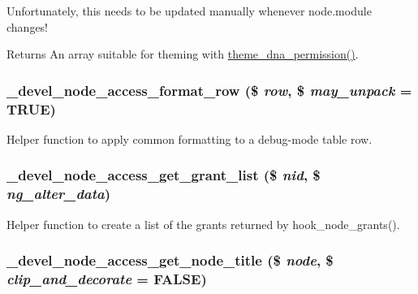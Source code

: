 Unfortunately, this needs to be updated manually whenever node.module changes!

\begin{DoxyReturn}{Returns}
An array suitable for theming with \hyperlink{devel__node__access_8module_a9a1d86356d3e21f44fd2bc73a915b329}{theme\_\-dna\_\-permission()}. 
\end{DoxyReturn}
\hypertarget{devel__node__access_8module_acd34231a07364b267c722f6335eb4a3f}{
\subsubsection[{\_\-devel\_\-node\_\-access\_\-format\_\-row}]{\setlength{\rightskip}{0pt plus 5cm}\_\-devel\_\-node\_\-access\_\-format\_\-row (\$ {\em row}, \/  \$ {\em may\_\-unpack} = {\ttfamily TRUE})}}
\label{devel__node__access_8module_acd34231a07364b267c722f6335eb4a3f}
Helper function to apply common formatting to a debug-\/mode table row. \hypertarget{devel__node__access_8module_a58e0c4afd1e983169bad627bcdfc9b89}{
\subsubsection[{\_\-devel\_\-node\_\-access\_\-get\_\-grant\_\-list}]{\setlength{\rightskip}{0pt plus 5cm}\_\-devel\_\-node\_\-access\_\-get\_\-grant\_\-list (\$ {\em nid}, \/  \$ {\em ng\_\-alter\_\-data})}}
\label{devel__node__access_8module_a58e0c4afd1e983169bad627bcdfc9b89}
Helper function to create a list of the grants returned by hook\_\-node\_\-grants(). \hypertarget{devel__node__access_8module_aae8673d182a87acb3b8039decbe5fb4f}{
\subsubsection[{\_\-devel\_\-node\_\-access\_\-get\_\-node\_\-title}]{\setlength{\rightskip}{0pt plus 5cm}\_\-devel\_\-node\_\-access\_\-get\_\-node\_\-title (\$ {\em node}, \/  \$ {\em clip\_\-and\_\-decorate} = {\ttfamily FALSE})}}
